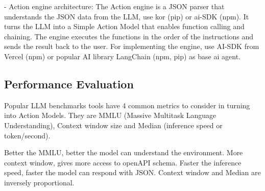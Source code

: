 \documentclass[conference]{IEEEtran}
\begin{document}
- Action engine architecture: The Action engine is a JSON parser that understands the JSON data from the LLM, use kor (pip) or ai-SDK (npm). It turns the LLM into a Simple Action Model that enables function calling and chaining. The engine executes the functions in the order of the instructions and sends the result back to the user. For implementing the engine, use AI-SDK from Vercel (npm) or popular AI library LangChain (npm, pip) as base ai agent.

\subsection{Performance Evaluation}
Popular LLM benchmarks tools have 4 common metrics to consider in turning into
Action Models. They are MMLU (Massive Multitask Language Understanding),
Context window size and Median (inference speed or token/second).

Better the MMLU, better the model can understand the environment. More context
window, gives more access to openAPI schema. Faster the inference speed, faster
the model can respond with JSON. Context window and Median are inversely
proportional.




\end{document}
